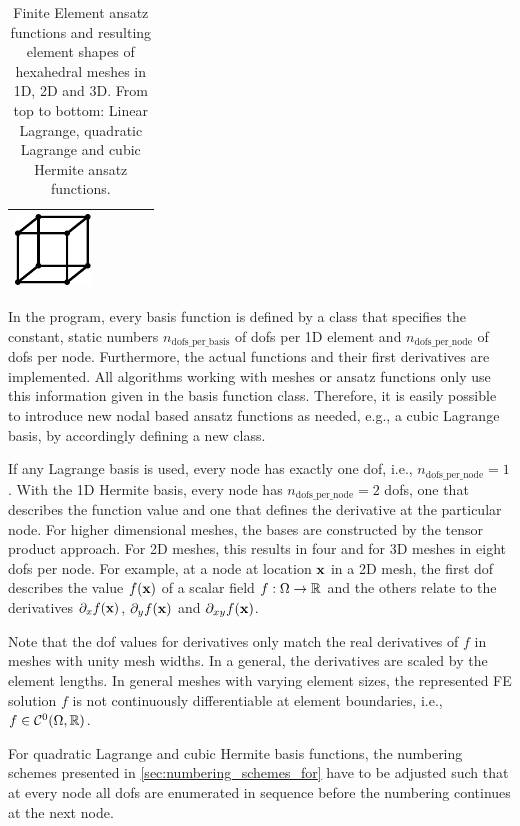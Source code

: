 \begin{table}
\begin{tabular}{|ll|lll|}
      \includegraphics[width=2cm]{images/implementation/ansatz_mesh_3.pdf} \vspace{2mm}\\
    \hline
  \end{tabular}
  \caption{Finite Element ansatz functions and resulting element shapes of hexahedral meshes in 1D, 2D and 3D. From top to bottom: Linear Lagrange, quadratic Lagrange and cubic Hermite ansatz functions.}%
  \label{tab:ansatz_functions_mesh}%
\end{table}

In the program, every basis function is defined by a class that specifies the constant, static numbers $n_\text{dofs\_per\_basis}$ of dofs per 1D element and $n_\text{dofs\_per\_node}$ of dofs per node. Furthermore, the actual functions and their first derivatives are implemented. 
All algorithms working with meshes or ansatz functions only use this information given in the basis function class. Therefore, it is easily possible to introduce new nodal based ansatz functions as needed, e.g., a cubic Lagrange basis, by accordingly defining a new class.

If any Lagrange basis is used, every node has exactly one dof, i.e., $n_\text{dofs\_per\_node}=1$. With the 1D Hermite basis, every node has $n_\text{dofs\_per\_node}=2$ dofs, one that describes the function value and one that defines the derivative at the particular node. For higher dimensional meshes, the bases are constructed by the tensor product approach. For 2D meshes, this results in four and for 3D meshes in eight dofs per node. For example, at a node at location $\textbf{x}$ in a 2D mesh, the first dof describes the value $f(\textbf{x})$ of a scalar field $f:\Omega \to \mathbb{R}$ and the others relate to the derivatives $\partial_x f(\textbf{x})$, $\partial_y f(\textbf{x})$ and $\partial_{xy} f(\textbf{x})$. 

Note that the dof values for derivatives only match the real derivatives of $f$ in meshes with unity mesh widths. In a general, the derivatives are scaled by the element lengths. In general meshes with varying element sizes, the represented FE solution $f$ is not continuously differentiable at element boundaries, i.e., $f\in\mathcal{C}^0(\Omega,\mathbb{R})$.

For quadratic Lagrange and cubic Hermite basis functions, the numbering schemes presented in \cref{sec:numbering_schemes_for} have to be adjusted such that at every node all dofs are enumerated in sequence before the numbering continues at the next node.


